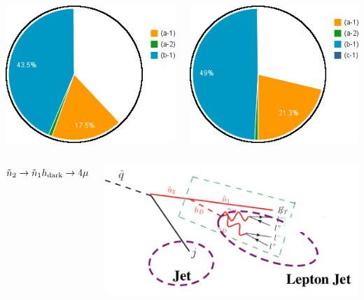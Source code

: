 \documentclass[compress]{beamer}
\newcommand{\s}[1]{{\mbox{\scriptsize #1}}}
\begin{document}
\begin{frame}
\begin{columns}
\includegraphics[width=\linewidth]{chart2d_2mu_400.png}

\includegraphics[width=\linewidth]{chart2d_2mu_600.png}
\end{columns}

\vspace{0.25 cm}
\begin{columns}
\mbox{$\tilde{n}_2 \to \tilde{n}_1 h_\s{dark} \to 4\mu$}

\includegraphics[width=\linewidth]{diagram_squark_4mu.png}


\end{columns}
\end{frame}
\end{document}
